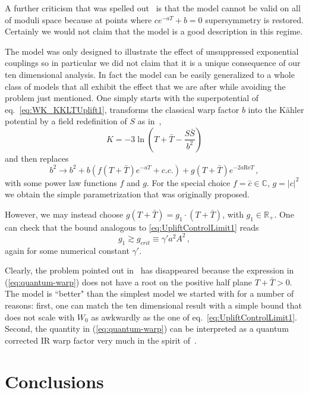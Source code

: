 \documentclass[aps,prd,amsmath,amsfonts,a4paper,11pt,reprint,twocolumn,square,numbers,showpacs,superscriptaddress,floatfix,sort&compress,nofootinbib]{revtex4-1}
\begin{document}
A further criticism that was spelled out~\cite{Kallosh:2018wme} is that the model cannot be valid on all of moduli space because at points where $c e^{-aT}+b=0$ supersymmetry is restored. Certainly we would not claim that the model is a good description in this regime. 

The model was only designed to illustrate the effect of unsuppressed exponential couplings so in particular we did not claim that it is a unique consequence of our ten dimensional analysis. In fact the model can be easily generalized to a whole class of models that all exhibit the effect that we are after  while avoiding the problem  just mentioned. One simply starts with the superpotential of eq.~\eqref{eq:WK_KKLTUplift1}, transforms the classical warp factor $b$ into the K\"ahler potential by a field redefinition of $S$ as in~\cite{GarciadelMoral:2017vnz},
\begin{equation}
K=-3\ln\left(T+\bar T-\frac{S\bar S}{b^2}\right)
\end{equation}
and then replaces
\begin{equation} \label{eq:quantum-warp}
b^2\rightarrow  b^2+b(f(T+\bar{T})e^{-a T}+c.c.)+g(T+\bar{T})e^{-2a\text{Re}T}\, ,
\end{equation}
with some power law functions $f$ and $g$. For the special choice $f=\bar{c}\in \mathbb{C}$, $g=|c|^2$  we obtain the simple parametrization that was originally proposed. 

However, we may instead choose $g(T+\bar{T})=g_1\cdot (T+\bar{T})$, with $g_1\in \mathbb{R}_+$. One can check that the bound analogous to \eqref{eq:UpliftControlLimit1} reads  
\begin{equation}
g_1\gtrsim g_{crit} \equiv \gamma' a^2A^2\, ,
\end{equation}
again for some numerical constant $\gamma'$.

Clearly, the problem pointed out in~\cite{Kallosh:2018wme} has disappeared because the expression in  (\ref{eq:quantum-warp}) does not have a root on the positive half plane $T+\bar{T}>0$. The model is ``better" than the simplest model we started with for a number of reasons: first, one can match the ten dimensional result with a simple bound that does not scale with $W_0$ as awkwardly as the one of eq.~\eqref{eq:UpliftControlLimit1}. Second, the quantity in (\ref{eq:quantum-warp}) can be interpreted as a quantum corrected IR warp factor very much in the spirit of~\cite{Giddings:2005ff}.

\section{Conclusions}
\end{document}
